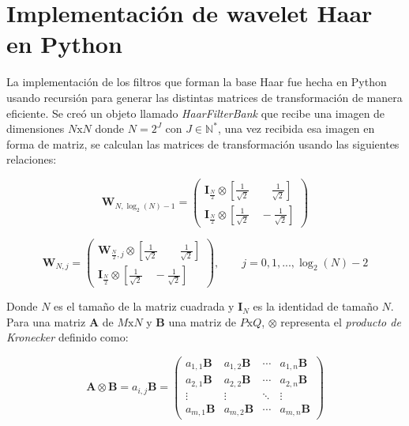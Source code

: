 \documentclass[conference]{IEEEtran}
\begin{document}
\section{Implementación de wavelet Haar en Python}

La implementación de los filtros que forman la base Haar fue hecha en Python usando recursión para generar las distintas matrices de transformación de manera eficiente. Se creó un objeto llamado \emph{HaarFilterBank} que recibe una imagen de dimensiones $N\text{x}N$ donde $N=2^J$ con $J \in \mathds{N}^*$, una vez recibida esa imagen en forma de matriz, se calculan las matrices de transformación usando las siguientes relaciones:

\begin{equation}
\pmb{W}_{N, \log_2(N)-1} =
\begin{pmatrix}
\pmb{I}_{\frac{N}{2}} \otimes \left[\frac{1}{\sqrt{2}} \qquad \frac{1}{\sqrt{2}}\right]\\
\pmb{I}_{\frac{N}{2}} \otimes \left[\frac{1}{\sqrt{2}} \quad -\frac{1}{\sqrt{2}}\right]
\end{pmatrix}
\end{equation}


\begin{equation}
\pmb{W}_{N, j} =
\begin{pmatrix}
\pmb{W}_{\frac{N}{2}, j} \otimes \left[\frac{1}{\sqrt{2}} \qquad \frac{1}{\sqrt{2}}\right]\\
\pmb{I}_{\frac{N}{2}} \otimes \left[\frac{1}{\sqrt{2}} \quad -\frac{1}{\sqrt{2}}\right]
\end{pmatrix}, \qquad j=0,1,...,\log_2(N)-2
\end{equation}


Donde $N$ es el tamaño de la matriz cuadrada y $\pmb{I}_N$ es la identidad de tamaño $N$. Para una matriz $\pmb{A}$ de $M\text{x}N$ y $\pmb{B}$ una matriz de $P\text{x}Q$, $\otimes$ representa el \emph{producto de Kronecker} definido como:

\begin{equation}
\pmb{A} \otimes \pmb{B} = a_{i, j}\pmb{B} =
\begin{pmatrix}
a_{1,1}\pmb{B} & a_{1,2}\pmb{B} & \cdots & a_{1,n}\pmb{B} \\
a_{2,1}\pmb{B} & a_{2,2}\pmb{B} & \cdots & a_{2,n}\pmb{B} \\
\vdots  & \vdots  & \ddots & \vdots  \\
a_{m,1}\pmb{B} & a_{m,2}\pmb{B} & \cdots & a_{m,n}\pmb{B}
\end{pmatrix}
\end{equation}
\end{document}
